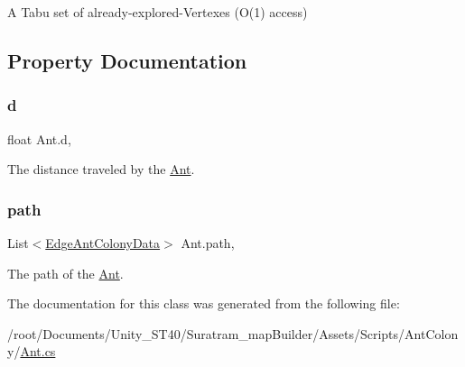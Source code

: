 A Tabu set of already-\/explored-\/\+Vertexes (O(1) access)



\subsection{Property Documentation}
\mbox{\label{classAnt_a9102aaa24cee957d2c82b710c337c591}} 
\subsubsection{\texorpdfstring{d}{d}}
{\footnotesize\ttfamily float Ant.\+d\hspace{0.3cm}{\ttfamily [get]}, {}}



The distance traveled by the \hyperlink{classAnt}{Ant}.

\mbox{\label{classAnt_ac13c32bfaeb44ea90f08a84ee10c4ccf}} 
\subsubsection{\texorpdfstring{path}{path}}
{\footnotesize\ttfamily List$<$\hyperlink{classEdgeAntColonyData}{Edge\+Ant\+Colony\+Data}$>$ Ant.\+path\hspace{0.3cm}{\ttfamily [get]}, {}}



The path of the \hyperlink{classAnt}{Ant}.



The documentation for this class was generated from the following file\+:\begin{DoxyCompactItemize}
\item 
/root/\+Documents/\+Unity\+\_\+\+S\+T40/\+Suratram\+\_\+map\+Builder/\+Assets/\+Scripts/\+Ant\+Colony/\hyperlink{Ant_8cs}{Ant.\+cs}\end{DoxyCompactItemize}
